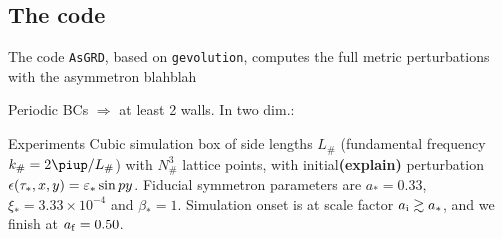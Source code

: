 





\subsection{The code}

\begin{frame}{The code}
    \texttt{AsGRD}, based on \texttt{gevolution}, computes the full metric perturbations with the asymmetron blahblah

    \pause
    \medskip
    Periodic BCs $\Rightarrow$ at least 2 walls. In two dim.: 

\end{frame}



\begin{frame}{Experiments}
    Cubic simulation box of side lengths $L_\#$ (fundamental frequency $k_\#=2\ppi/L_\#$) with $N_\#^3$ lattice points, with initial\textbf{(explain)} perturbation $\epsilon(\tau_\ast, x, y)=\varepsilon_\ast \sin{py}$. Fiducial symmetron parameters are $a_\ast = 0.33$, $\xi_\ast = 3.33\times 10^{-4}$ and $\beta_\ast=1$. Simulation onset is at scale factor $a_\mathrm{i} \gtrsim  a_\ast$, and we finish at $a_\mathrm{f}=0.50$.
    



\end{frame}


